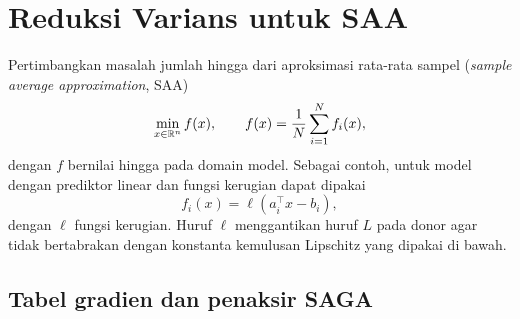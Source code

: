 \chapter{Reduksi Varians untuk SAA}
\label{becker03:chapter:variance-reduction}

Pertimbangkan masalah jumlah hingga dari aproksimasi rata-rata sampel
(\emph{sample average approximation}, SAA)
\begin{equation}
  \label{becker03:eq:finite-sum}
  \min_{x\in\mathbb{R}^n} f(x),
  \qquad
  f(x)=\frac{1}{N}\sum_{i=1}^{N}f_i(x),
\end{equation}
dengan $f$ bernilai hingga pada domain model. Sebagai contoh, untuk model
dengan prediktor linear dan fungsi kerugian dapat dipakai
\begin{equation}
  \label{becker03:eq:linearized-loss}
  f_i(x)=\ell(a_i^\top x-b_i),
\end{equation}
dengan $\ell$ fungsi kerugian. Huruf $\ell$ menggantikan huruf $L$ pada donor
agar tidak bertabrakan dengan konstanta kemulusan Lipschitz yang dipakai di
bawah.

\section{Tabel gradien dan penaksir SAGA}
\label{becker03:section:saga-estimator}

